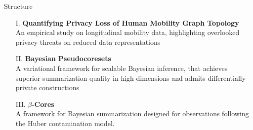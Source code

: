 \documentclass[hyperref={colorlinks = true},unknownkeysallowed]{beamer}
\let\oldcitep=\citep
\renewcommand\citep[1]{\hypersetup{linkcolor=UBCblue}\hyperlink{#1}{\oldcitep{#1}}}
\begin{document}

\begin{frame}{Structure}
	\begin{itemize}
		\item[I.]\textbf{Quantifying Privacy Loss of Human Mobility Graph Topology}  \small{\citep{manousakas2018quantifying}} \\
		An empirical study on longitudinal mobility data, highlighting overlooked privacy threats on reduced data representations
		\item[II.]\textbf{Bayesian Pseudocoresets} \small{\citep{psvi}} \\
		A variational framework for scalable Bayesian inference, that achieves superior summarization quality in high-dimensions and admits differentially private constructions
		\item[III.]\textbf{$\beta$-Cores} \small{\citep{beta-cores}}  \\
		A framework for Bayesian summarization designed for observations following the Huber contamination model.
	\end{itemize}
\end{frame}


\end{document}
